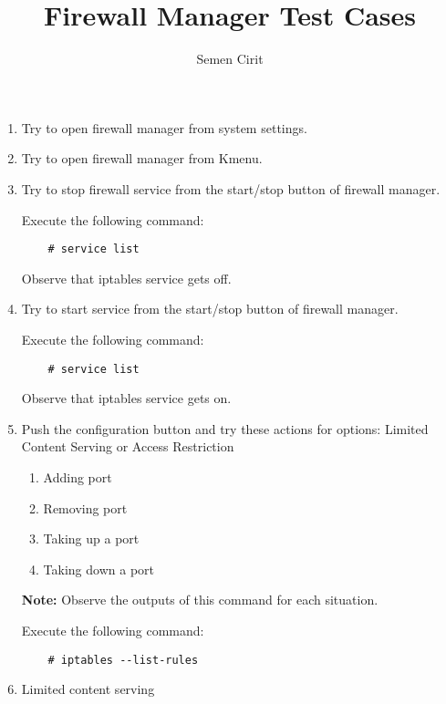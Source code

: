\documentclass[a4paper,10pt]{article}
\title{Firewall Manager Test Cases}
\author{Semen Cirit}
\begin{document}
\maketitle

\begin{enumerate}
    \item Try to open firewall manager from system settings.
    \item Try to open firewall manager from Kmenu.
    \item Try to stop firewall service from the start/stop button of firewall manager.

    Execute the following command:

\begin{verbatim}
    # service list
\end{verbatim} 

    Observe that iptables service gets off.

    \item Try to start service from the start/stop button of firewall manager.

        Execute the following command:

\begin{verbatim}
    # service list
\end{verbatim}

       Observe that iptables service gets on.

\item Push the configuration button and try these actions for options: Limited Content Serving or Access Restriction
    \begin{enumerate}
        \item Adding  port
        \item Removing port
        \item Taking up a port
        \item Taking down a port
    \end{enumerate}

\textbf{Note:} Observe the outputs of this command for each situation.

Execute the following command:

\begin{verbatim}
    # iptables --list-rules
\end{verbatim} 

\item Limited content serving


\end{enumerate}
\end{document}

